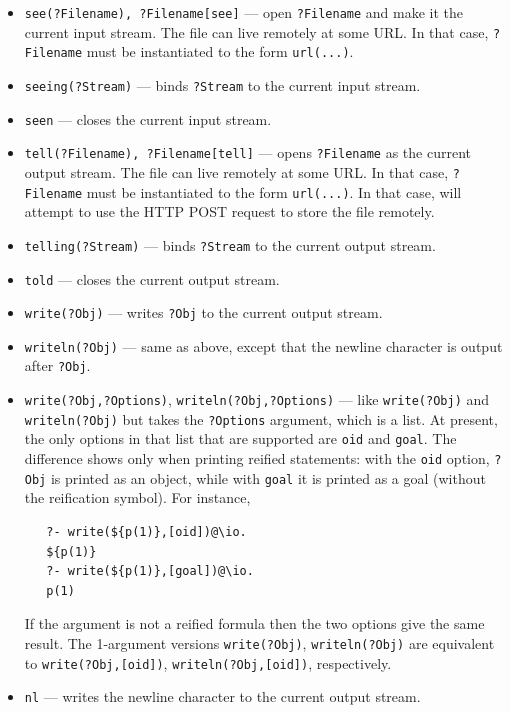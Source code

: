 \documentclass[11pt]{article}
\newcommand{\ERGO}{\mbox{\smaller{\ensuremath{\cal{E}}\smaller{{\sc{RGO}}}}}\xspace}
\newcommand{\FLSYSTEM}{\ERGO}
\begin{document}
\begin{itemize}
\item  {\tt see(?Filename), ?Filename[see]} --- open {\tt ?Filename} and
  make it the current input stream.
  The file can live remotely at some URL. In that case, {\tt ?Filename}
  must be instantiated to the form {\tt url(...)}.  
\item {\tt seeing(?Stream)} --- binds {\tt ?Stream} to the current input
  stream.
\item {\tt seen} --- closes the current input stream.
\item {\tt tell(?Filename), ?Filename[tell]} --- opens {\tt ?Filename} as the current output
  stream. The file can live remotely at some URL. In that case, {\tt ?Filename}
  must be instantiated to the form {\tt url(...)}.
  In that case, \FLSYSTEM will attempt to use the HTTP POST request to store
  the file remotely.
\item {\tt telling(?Stream)} --- binds {\tt ?Stream} to the current output
  stream. 
\item {\tt told} --- closes the current output stream.
\item {\tt write(?Obj)} --- writes {\tt ?Obj} to the current output stream.
\item {\tt writeln(?Obj)} --- same as above,
  except that the newline character is output after {\tt ?Obj}.
\item {\tt write(?Obj,?Options)}, \texttt{writeln(?Obj,?Options)} ---  like
  \texttt{write(?Obj)} and \texttt{writeln(?Obj)} but takes the
  \texttt{?Options} argument, which is a list. At present, the only options
  in that list that are supported are \texttt{oid} and \texttt{goal}.
  The difference shows only when printing reified statements: with the
  \texttt{oid} option, \texttt{?Obj} is printed as an object, while
  with \texttt{goal} it is printed as a goal (without the reification
  symbol). For instance,
\begin{verbatim}
   ?- write(${p(1)},[oid])@\io.
   ${p(1)}
   ?- write(${p(1)},[goal])@\io.
   p(1)
\end{verbatim}
  If the argument is not a reified formula then the two options give the
  same result. The 1-argument versions \texttt{write(?Obj)},
  \texttt{writeln(?Obj)} are equivalent to \texttt{write(?Obj,[oid])},
  \texttt{writeln(?Obj,[oid])}, respectively.
\item {\tt nl} --- writes the newline character to the current output
  stream.

\end{itemize}
\end{document}
